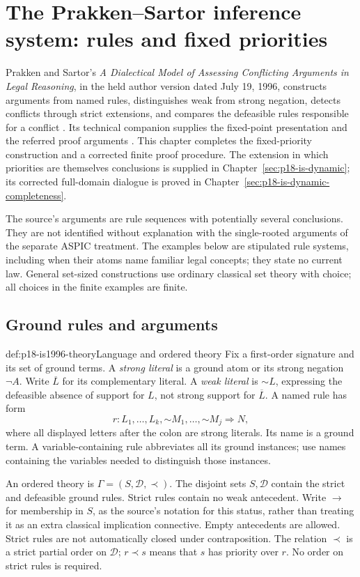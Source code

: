 \chapter{The Prakken--Sartor inference system: rules and fixed priorities}
\label{sec:p18-is1996}

Prakken and Sartor's \emph{A Dialectical Model of Assessing Conflicting
Arguments in Legal Reasoning}, in the held author version dated
July 19, 1996, constructs arguments from named rules, distinguishes
weak from strong negation, detects conflicts through strict extensions,
and compares the defeasible rules responsible for a conflict
\cite{PrakkenSartor1996Dialectical}.
Its technical companion supplies the fixed-point presentation and
the referred proof arguments \cite{PrakkenSartor1997Priorities}.
This chapter completes the fixed-priority construction and a corrected
finite proof procedure. The extension in which priorities are
themselves conclusions is supplied in
Chapter~\ref{sec:p18-is-dynamic}; its corrected full-domain
dialogue is proved in Chapter~\ref{sec:p18-is-dynamic-completeness}.

The source's arguments are rule sequences with potentially several
conclusions. They are not identified without explanation with the
single-rooted arguments of the separate ASPIC treatment.
The examples below are stipulated rule systems, including when
their atoms name familiar legal concepts; they state no current law.
General set-sized constructions use ordinary classical set theory
with choice; all choices in the finite examples are finite.

\section{Ground rules and arguments}

\begin{hbdefinition}{def:p18-is1996-theory}{Language and ordered theory}
Fix a first-order signature and its set of ground terms.
A \emph{strong literal} is a ground atom or its strong negation
\(\neg A\). Write \(\overline L\) for its complementary literal.
A \emph{weak literal} is \(\mathord{\sim}L\), expressing the
defeasible absence of support for \(L\), not strong support for
\(\overline L\).
A named rule has form
\[
r:L_1,\ldots,L_k,\mathord{\sim}M_1,\ldots,\mathord{\sim}M_j
   \Rightarrow N,
\]
where all displayed letters after the colon are strong literals.
Its name is a ground term. A variable-containing rule abbreviates
all its ground instances; use names containing the variables
needed to distinguish those instances.

An ordered theory is \(\Gamma=(S,\mathcal D,\prec)\).
The disjoint sets \(S,\mathcal D\) contain the strict and defeasible
ground rules. Strict rules contain no weak antecedent.
Write \(\to\) for membership in \(S\), as the source's notation
for this status, rather than treating it as an extra classical
implication connective. Empty antecedents are allowed.
Strict rules are not automatically closed under contraposition.
The relation \(\prec\) is a strict partial order on \(\mathcal D\);
\(r\prec s\) means that \(s\) has priority over \(r\).
No order on strict rules is required.
\end{hbdefinition}

